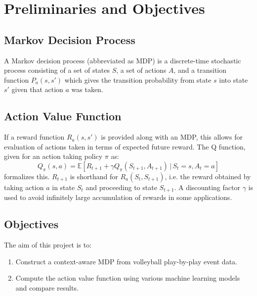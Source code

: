 \documentclass{sfuthesis}
\begin{document}
	\section{Preliminaries and Objectives}
	\subsection{Markov Decision Process}
	A Markov decision process (abbreviated as MDP) is a discrete-time stochastic process consisting of a set of states $S$, a set of actions $A$, and a transition function $P_a(s,s')$ which gives the transition probability from state $s$ into state $s'$ given that action $a$ was taken. 
	\subsection{Action Value Function}
	If a reward function $R_a(s,s')$ is provided along with an MDP, this allows for evaluation of actions taken in terms of expected future reward. The Q function, given for an action taking policy $\pi$ as:
	\begin{equation}
		Q_\pi(s,a) = \mathbb{E} \left[  R_{t+1} + \gamma Q_{\pi}(S_{t+1}, A_{t+1}) \, | \, S_t = s, A_t = a \right]
	\end{equation}
	formalizes this. $R_{t+1}$ is shorthand for $R_a(S_t,S_{t+1})$, i.e. the reward obtained by taking action $a$ in state $S_t$ and proceeding to state $S_{t+1}$. A discounting factor $\gamma$ is used to avoid infinitely large accumulation of rewards in some applications.
	\subsection{Objectives}
	The aim of this project is to:
	\begin{enumerate}
		\item Construct a context-aware MDP from volleyball play-by-play event data.
		\item Compute the action value function using various machine learning models and compare results.
	\end{enumerate}  
	
\end{document}
